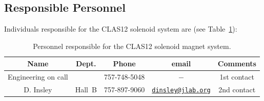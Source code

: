%
%
%

\subsection{Responsible Personnel}

Individuals responsible for the CLAS12 solenoid system are (see Table~\ref{tb:solenoid}):

\begin{table}[!htb]
\centering
\begin{tabular}{|c|c|c|c|c|} \hline
Name&Dept.&Phone&email&Comments \\ \hline
Engineering on call&  & 757-748-5048 &$-$& 1st contact \\ \hline
D. Insley & Hall~B  &757-897-9060&\href{mailto:dinsley@jlab.org}{\nolinkurl{dinsley@jlab.org}}  &2nd contact \\ \hline
\end{tabular}
\caption{Personnel responsible for the CLAS12 solenoid magnet system.} 
\label{tb:solenoid}
\end{table}

